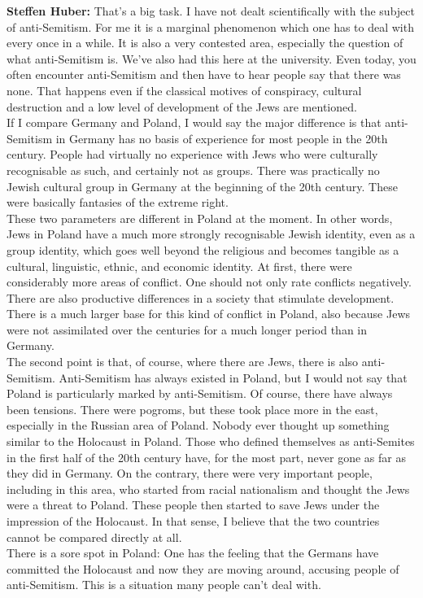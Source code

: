 \textbf{Steffen Huber:} That's a big task. I have not dealt scientifically with the subject of anti-Semitism. For me it is a marginal phenomenon which one has to deal with every once in a while. It is also a very contested area, especially the question of what anti-Semitism is. We’ve also had this here at the university. Even today, you often encounter anti-Semitism and then have to hear people say that there was none. That happens even if the classical motives of conspiracy, cultural destruction and a low level of development of the Jews are mentioned. \\
If I compare Germany and Poland, I would say the major difference is that anti-Semitism in Germany has no basis of experience for most people in the 20th century. People had virtually no experience with Jews who were culturally recognisable as such, and certainly not as groups. There was practically no Jewish cultural group in Germany at the beginning of the 20th century. These were basically fantasies of the extreme right.\\
These two parameters are different in Poland at the moment. In other words, Jews in Poland have a much more strongly recognisable Jewish identity, even as a group identity, which goes well beyond the religious and becomes tangible as a cultural, linguistic, ethnic, and economic identity. At first, there were considerably more areas of conflict. One should not only rate conflicts negatively. There are also productive differences in a society that stimulate development. There is a much larger base for this kind of conflict in Poland, also because Jews were not assimilated over the centuries for a much longer period than in Germany.  \\
The second point is that, of course, where there are Jews, there is also anti-Semitism. Anti-Semitism has always existed in Poland, but I would not say that Poland is particularly marked by anti-Semitism. Of course, there have always been tensions. There were pogroms, but these took place more in the east, especially in the Russian area of Poland. Nobody ever thought up something similar to the Holocaust in Poland. Those who defined themselves as anti-Semites in the first half of the 20th century have, for the most part, never gone as far as they did in Germany. On the contrary, there were very important people, including in this area, who started from racial nationalism and thought the Jews were a threat to Poland. These people then started to save Jews under the impression of the Holocaust. In that sense, I believe that the two countries cannot be compared directly at all.\\
There is a sore spot in Poland: One has the feeling that the Germans have committed the Holocaust and now they are moving around, accusing people of anti-Semitism. This is a situation many people can't deal with. 

